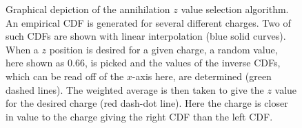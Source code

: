 \documentclass[superscriptaddress,aps,prb,11pt]{revtex4-1}
\begin{document}
\begin{figure}
  \centering
  \label{fig:z_interpolation}
  \caption{Graphical depiction of the annihilation $z$ value selection algorithm.  An empirical CDF is generated for several different charges.  Two of such CDFs are shown with linear interpolation (blue solid curves).  When a $z$ position is desired for a given charge, a random value, here shown as 0.66, is picked and the values of the inverse CDFs, which can be read off of the $x$-axis here, are determined (green dashed lines).  The weighted average is then taken to give the $z$ value for the desired charge (red dash-dot line).  Here the charge is closer in value to the charge giving the right CDF than the left CDF.}
\end{figure}
\end{document}
